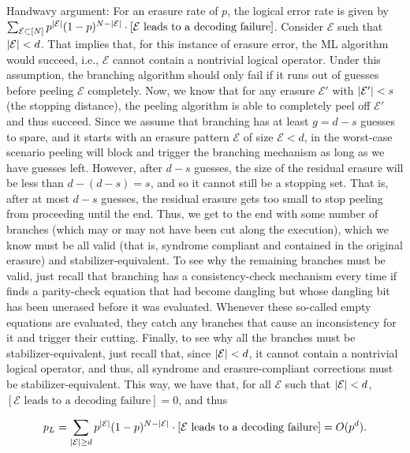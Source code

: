 \documentclass{article}
\begin{document}
Handwavy argument: For an erasure rate of $p$, the logical error rate is given by $\sum_{\mathcal{E} \subset [N]} p^{\abs{\mathcal{E}}}(1-p)^{N - \abs{\mathcal{E}}} \cdot [\mathcal{E} \text{ leads to a decoding failure}]$. Consider $\mathcal{E}$ such that $\abs{\mathcal{E}} < d$. That implies that, for this instance of erasure error, the ML algorithm would succeed, i.e., $\mathcal{E}$ cannot contain a nontrivial logical operator. Under this assumption, the branching algorithm should only fail if it runs out of guesses before peeling $\mathcal{E}$ completely. Now, we know that for any erasure $\mathcal{E}'$ with $\abs{\mathcal{E}'} < s$ (the stopping distance), the peeling algorithm is able to completely peel off $\mathcal{E}'$ and thus succeed. Since we assume that branching has at least $g = d-s$ guesses to spare, and it starts with an erasure pattern $\mathcal{E}$ of size $\mathcal{E} < d$, in the worst-case scenario peeling will block and trigger the branching mechanism as long as we have guesses left. However, after $d-s$ guesses, the size of the residual erasure will be less than $d - (d-s) = s$, and so it cannot still be a stopping set. That is, after at most $d-s$ guesses, the residual erasure gets too small to stop peeling from proceeding until the end. Thus, we get to the end with some number of branches (which may or may not have been cut along the execution), which we know must be all valid (that is, syndrome compliant and contained in the original erasure) and stabilizer-equivalent. To see why the remaining branches must be valid, just recall that branching has a consistency-check mechanism every time if finds a parity-check equation that had become dangling but whose dangling bit has been unerased before it was evaluated. Whenever these so-called empty equations are evaluated, they catch any branches that cause an inconsistency for it and trigger their cutting. Finally, to see why all the branches must be stabilizer-equivalent, just recall that, since $\abs{\mathcal{E}} < d$, it cannot contain a nontrivial logical operator, and thus, all syndrome and erasure-compliant corrections must be stabilizer-equivalent. This way, we have that, for all $\mathcal{E}$ such that $\abs{\mathcal{E}} < d$, $[\mathcal{E} \text{ leads to a decoding failure}] = 0$, and thus 

$$p_L = \sum_{\abs{\mathcal{E}} \ge d} p^{\abs{\mathcal{E}}}(1-p)^{N - \abs{\mathcal{E}}} \cdot [\mathcal{E} \text{ leads to a decoding failure}] = O(p^d). $$
\end{document}
